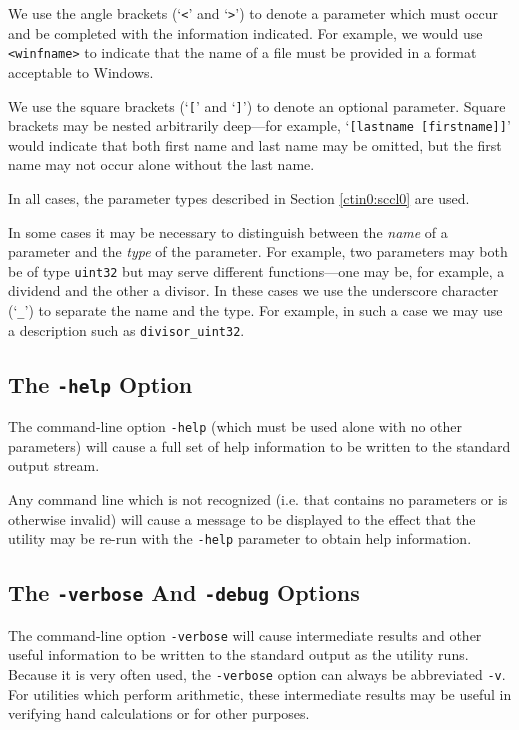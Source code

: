 We use the angle brackets (`\texttt{<}' and `\texttt{>}') to denote a 
parameter which must occur and be completed with the information
indicated.  For example, we would use \texttt{<winfname>} to indicate
that the name of a file must be provided in a format acceptable to 
Windows.

We use the square brackets (`\texttt{[}' and `\texttt{]}') to denote
an optional parameter.  Square brackets may be nested arbitrarily
deep---for example, `\texttt{[lastname [firstname]]}' would 
indicate that both first name and last name may be omitted, but
the first name may not occur alone without the last name.

In all cases, the parameter types described in Section
\ctinzeroxrefhyphen{}\ref{ctin0:sccl0}
are used.

In some cases it may be necessary to distinguish between the 
\emph{name} of a parameter and the \emph{type} of the parameter.
For example, two parameters may both be of type \texttt{uint32} 
but may serve different functions---one may be, for example,
a dividend and the other a divisor.  In these cases we use
the underscore character (`\texttt{\_}') to separate
the name and the type.  For example, in such a case we may
use a description such as \texttt{divisor\_uint32}.

\subsection{The \texttt{-help} Option}
\label{cdcm0:sccl0:shel0}

The command-line option \texttt{-help} (which must be used alone with no
other parameters) will cause a full set of help information to be written
to the standard output stream.

Any command line which is not recognized (i.e. that contains no parameters or is
otherwise invalid) will cause a message to be displayed to the effect that
the utility may be re-run with the \texttt{-help} parameter to obtain help
information.

\subsection{The \texttt{-verbose} And \texttt{-debug} Options}
\label{cdcm0:sccl0:sver0}

The command-line option \texttt{-verbose} will cause intermediate results and other
useful information to be written to the standard output as the utility runs.
Because it is very often
used, the \texttt{-verbose} option
can always be abbreviated \texttt{-v}.
For utilities which perform arithmetic, these intermediate results may be useful
in verifying hand calculations or for other purposes.

